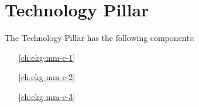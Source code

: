 \part{Technology Pillar}\label{pt:ekgmm-c} %

The Technology Pillar has the following components:

\begin{itemize}[leftmargin=.5in]
    \item [\ref{ch:ekg-mm-c-1}] 
    \item [\ref{ch:ekg-mm-c-2}] 
    \item [\ref{ch:ekg-mm-c-3}] 
\end{itemize}

%
%
%
%
%




